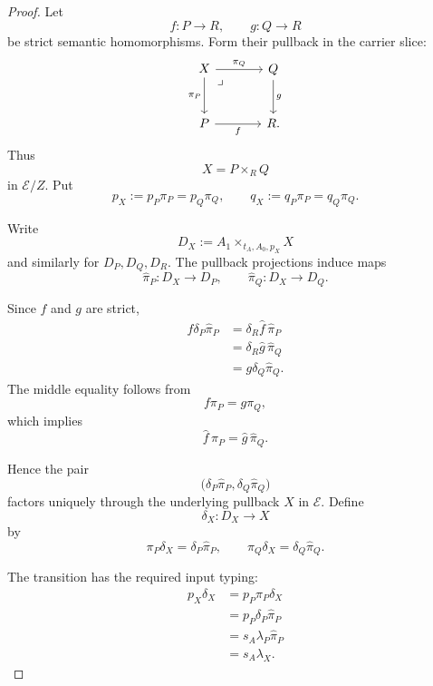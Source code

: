 \begin{proof}
    Let
    \[
        f:P\to R,
        \qquad
        g:Q\to R
    \]
    be strict semantic homomorphisms. Form their pullback in the carrier
    slice:
    \[
    \begin{tikzcd}[column sep=large, row sep=large]
        X
            \arrow[r, "\pi_Q"]
            \arrow[d, "\pi_P"']
            \arrow[dr, phantom, "\lrcorner", very near start]
        &
        Q
            \arrow[d, "g"]
        \\
        P
            \arrow[r, "f"']
        &
        R .
    \end{tikzcd}
    \]
    Thus
    \[
        X=P\times_RQ
    \]
    in \(\mathcal E/Z\). Put
    \[
        p_X:=p_P\pi_P=p_Q\pi_Q,
        \qquad
        q_X:=q_P\pi_P=q_Q\pi_Q.
    \]

    Write
    \[
        D_X
        :=
        A_1\times_{t_A,A_0,p_X}X
    \]
    and similarly for \(D_P,D_Q,D_R\). The pullback projections induce maps
    \[
        \widehat\pi_P:D_X\to D_P,
        \qquad
        \widehat\pi_Q:D_X\to D_Q.
    \]

    Since \(f\) and \(g\) are strict,
    \[
    \begin{aligned}
        f\delta_P\widehat\pi_P
        &=
        \delta_R\widehat f\,\widehat\pi_P
        \\
        &=
        \delta_R\widehat g\,\widehat\pi_Q
        \\
        &=
        g\delta_Q\widehat\pi_Q.
    \end{aligned}
    \]
    The middle equality follows from
    \[
        f\pi_P=g\pi_Q,
    \]
    which implies
    \[
        \widehat f\,\widehat\pi_P
        =
        \widehat g\,\widehat\pi_Q.
    \]

    Hence the pair
    \[
        \bigl(
            \delta_P\widehat\pi_P,
            \delta_Q\widehat\pi_Q
        \bigr)
    \]
    factors uniquely through the underlying pullback \(X\) in
    \(\mathcal E\). Define
    \[
        \delta_X:D_X\to X
    \]
    by
    \[
        \pi_P\delta_X
        =
        \delta_P\widehat\pi_P,
        \qquad
        \pi_Q\delta_X
        =
        \delta_Q\widehat\pi_Q.
    \]

    The transition has the required input typing:
    \[
    \begin{aligned}
        p_X\delta_X
        &=
        p_P\pi_P\delta_X
        \\
        &=
        p_P\delta_P\widehat\pi_P
        \\
        &=
        s_A\lambda_P\widehat\pi_P
        \\
        &=
        s_A\lambda_X.
    \end{aligned}
    \]


\end{proof}
